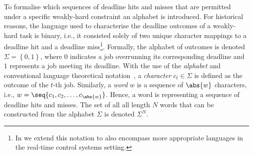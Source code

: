 To formalise which sequences of deadline hits and misses that are permitted under a specific weakly-hard constraint an alphabet is introduced.
For historical reasons, the language used to characterise the deadline outcomes of a weakly-hard task is binary, i.e., it consisted solely of two unique character mappings to a deadline hit and a deadline miss\footnote{In  we extend this notation to also encompass more appropriate languages in the real-time control systems setting.}.
Formally, the alphabet of outcomes is denoted $\Sigma = \left\{ 0, 1 \right\}$, where $0$ indicates a job overrunning its corresponding deadline and $1$ represents a job meeting its deadline.
With the use of the \emph{alphabet} and conventional language theoretical notation~\addref{}, a \emph{character} $c_t \in \Sigma$ is defined as the outcome of the $t$-th job.
Similarly, a \emph{word} $w$ is a sequence of $\abs{w}$ characters, i.e., $w = \seq{c_1, c_2, \ldots, c_{\abs{w}}}$.
Hence, a word is representing a sequence of deadline hits and misses.
The set of all all length $N$ words that can be constructed from the alphabet $\Sigma$ is denoted $\Sigma^N$.

